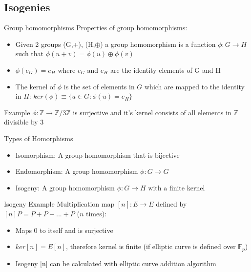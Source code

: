 \documentclass{beamer}
\begin{document}
\subsection{Isogenies}
\begin{frame}{Group homomorphisms}
Properties of group homomorphisms:
\begin{itemize}[\textbullet]
	\item Given 2 groups (G,+), (H,$\oplus$) a group homomorphism is a function $\phi: G \to H$ such that $\phi(u + v) = \phi(u) \oplus \phi(v)$ 
	\item $\phi(e_G) = e_H$ where $e_G$ and $e_H$ are the identity elements of G and H
	\item The kernel of $\phi$ is the set of elements in $G$ which are mapped to the identity in $H$:
	$ker(\phi) \equiv \{u\in G:\phi(u)=e_H\}$
\end{itemize}
	 
	
	\begin{block}{Example}
		$\phi: \mathbb{Z}\to\mathbb{Z}/3\mathbb{Z}$ is surjective and it's kernel consists of all elements in $\mathbb{Z}$ divisible by 3
		
		
	\end{block}
\end{frame}
\begin{frame}{Types of Homorphisms}
	\begin{itemize}[\textbullet]
		\item Isomorphism: A group homomorphism that is bijective %
		\item Endomorphism: A group homomorphism $\phi: G \to G$
		\item Isogeny: A group homomorphism $\phi : G \to H$ with a finite kernel
	\end{itemize}

\begin{block}{Isogeny Example}
	Multiplication map $[n]: E \to E$ defined by $[n]P = P + P + ...+ P$ ($n$ times):
	\begin{itemize}[\textbullet]
		\item Maps 0 to itself and is surjective
		\item $ker[n] = E[n]$, therefore kernel is finite (if elliptic curve is defined over $\mathbb{F}_p$)
		\item Isogeny [n] can be calculated with elliptic curve addition algorithm %
		
	\end{itemize}
\end{block}

\end{frame}
\end{document}
